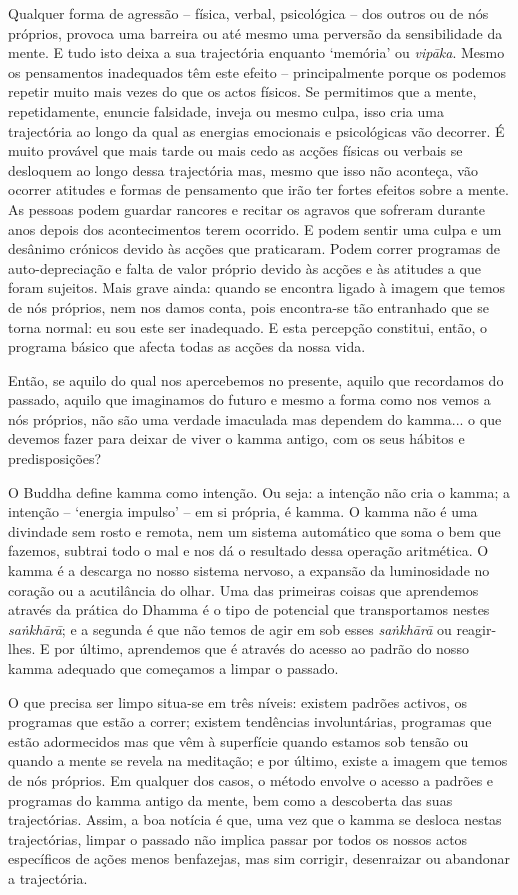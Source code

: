 Qualquer forma de agressão -- física, verbal, psicológica -- dos outros ou de nós próprios, provoca uma barreira ou até mesmo uma perversão da sensibilidade da mente. E tudo isto deixa a sua trajectória enquanto `memória' ou \emph{vipāka}. Mesmo os pensamentos inadequados têm este efeito -- principalmente porque os podemos repetir muito mais vezes do que os actos físicos. Se permitimos que a mente, repetidamente, enuncie falsidade, inveja ou mesmo culpa, isso cria uma trajectória ao longo da qual as energias emocionais e psicológicas vão decorrer. É muito provável que mais tarde ou mais cedo as acções físicas ou verbais se desloquem ao longo dessa trajectória mas, mesmo que isso não aconteça, vão ocorrer atitudes e formas de pensamento que irão ter fortes efeitos sobre a mente. As pessoas podem guardar rancores e recitar os agravos que sofreram durante anos depois dos acontecimentos terem ocorrido. E podem sentir uma culpa e um desânimo crónicos devido às acções que praticaram. Podem correr programas de auto-depreciação e falta de valor próprio devido às acções e às atitudes a que foram sujeitos. Mais grave ainda: quando se encontra ligado à imagem que temos de nós próprios, nem nos damos conta, pois encontra-se tão entranhado que se torna normal: eu sou este ser inadequado. E esta percepção constitui, então, o programa básico que afecta todas as acções da nossa vida.

Então, se aquilo do qual nos apercebemos no presente, aquilo que recordamos do passado, aquilo que imaginamos do futuro e mesmo a forma como nos vemos a nós próprios, não são uma verdade imaculada mas dependem do kamma... o que devemos fazer para deixar de viver o kamma antigo, com os seus hábitos e predisposições?

O Buddha define kamma como intenção. Ou seja: a intenção não cria o kamma; a intenção -- `energia impulso' -- em si própria, é kamma. O kamma não é uma divindade sem rosto e remota, nem um sistema automático que soma o bem que fazemos, subtrai todo o mal e nos dá o resultado dessa operação aritmética. O kamma é a descarga no nosso sistema nervoso, a expansão da luminosidade no coração ou a acutilância do olhar. Uma das primeiras coisas que aprendemos através da prática do Dhamma é o tipo de potencial que transportamos nestes \emph{saṅkhārā}; e a segunda é que não temos de agir em sob esses \emph{saṅkhārā} ou reagir-lhes. E por último, aprendemos que é através do acesso ao padrão do nosso kamma adequado que começamos a limpar o passado.

O que precisa ser limpo situa-se em três níveis: existem padrões activos, os programas que estão a correr; existem tendências involuntárias, programas que estão adormecidos mas que vêm à superfície quando estamos sob tensão ou quando a mente se revela na meditação; e por último, existe a imagem que temos de nós próprios. Em qualquer dos casos, o método envolve o acesso a padrões e programas do kamma antigo da mente, bem como a descoberta das suas trajectórias. Assim, a boa notícia é que, uma vez que o kamma se desloca nestas trajectórias, limpar o passado não implica passar por todos os nossos actos específicos de ações menos benfazejas, mas sim corrigir, desenraizar ou abandonar a trajectória.

